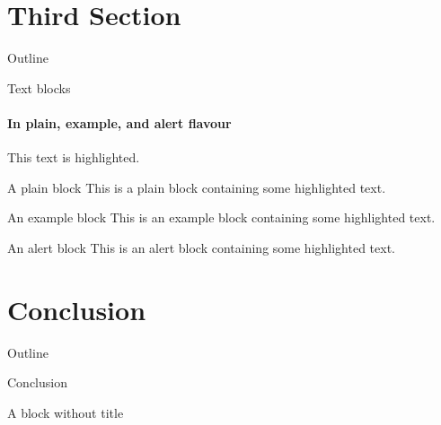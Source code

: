 \documentclass[aspectratio=169, 22pt]{beamer}
\begin{document}
\section{Third Section}
\begin{frame}{Outline}
  \tableofcontents[currentsection]
\end{frame}

\begin{frame}[label=simmonshall]{Text blocks}
  \framesubtitle{In plain, example, and \alert{alert} flavour}
  \alert{This text} is highlighted.

  \begin{block}{A plain block}
    This is a plain block containing some \alert{highlighted text}.
  \end{block}
  \begin{exampleblock}{An example block}
    This is an example block containing some \alert{highlighted text}.
  \end{exampleblock}
  \begin{alertblock}{An alert block}
    This is an alert block containing some \alert{highlighted text}.
  \end{alertblock}
\end{frame}

\section{Conclusion}
\begin{frame}{Outline}
\end{frame}

\begin{frame}{Conclusion}
  \begin{shaded}
    \LARGE A block without title
  \end{shaded}  

\end{frame}

\makethanks
\end{document}
